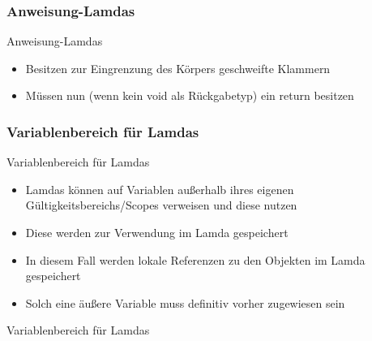 \subsubsection{Anweisung-Lamdas}
\begin{frame}{Anweisung-Lamdas}
	\begin{itemize}
		\item Besitzen zur Eingrenzung des Körpers geschweifte Klammern
		\item Müssen nun (wenn kein \alert{void} als Rückgabetyp) ein \alert{return} besitzen	
	\end{itemize}
	
	
\end{frame}

\subsubsection{Variablenbereich für Lamdas}
\begin{frame}{Variablenbereich für Lamdas}
	\begin{itemize}
		\item Lamdas können auf Variablen außerhalb ihres eigenen Gültigkeitsbereichs/Scopes verweisen und diese nutzen
		\item Diese werden zur Verwendung im Lamda gespeichert
		\item In diesem Fall werden lokale Referenzen zu den Objekten im Lamda gespeichert
		\item Solch eine äußere Variable muss definitiv vorher zugewiesen sein
	\end{itemize}
	
\end{frame}

\begin{frame}{Variablenbereich für Lamdas}
	
\end{frame}


